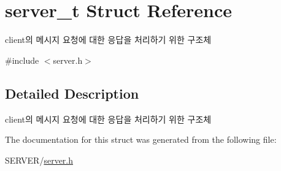 \hypertarget{structserver__t}{\section{server\-\_\-t Struct Reference}
\label{structserver__t}
}


client의 메시지 요청에 대한 응답을 처리하기 위한 구조체  




{\ttfamily \#include $<$server.\-h$>$}



\subsection{Detailed Description}
client의 메시지 요청에 대한 응답을 처리하기 위한 구조체 

The documentation for this struct was generated from the following file\-:\begin{DoxyCompactItemize}
\item 
S\-E\-R\-V\-E\-R/\hyperlink{server_8h}{server.\-h}\end{DoxyCompactItemize}
